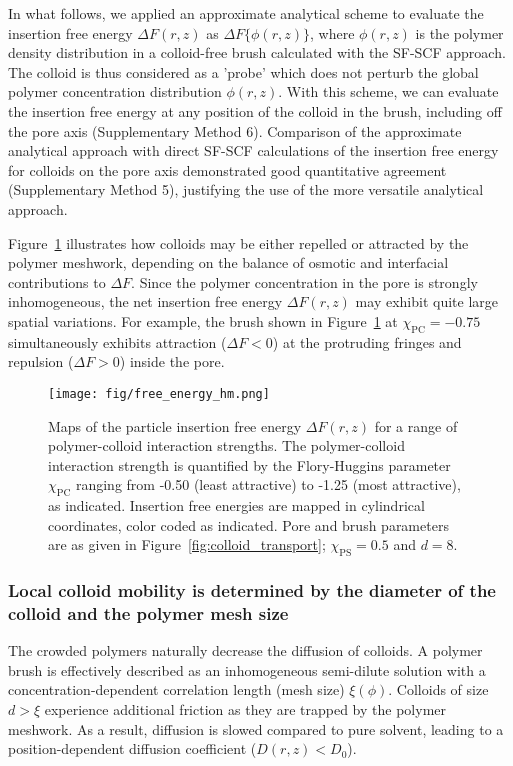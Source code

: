 \documentclass[12pt, a4paper]{article}
\begin{document}
In what follows, we applied an approximate analytical scheme to evaluate the insertion free energy $\Delta F(r,z)$ as $\Delta F\{\phi(r,z)\}$, where $\phi(r,z)$ is the polymer density distribution in a colloid-free brush calculated with the SF-SCF approach.
The colloid is thus considered as a 'probe' which does not perturb the global polymer concentration distribution $\phi(r,z)$.
With this scheme, we can evaluate the insertion free energy at any position of the colloid in the brush, including off the pore axis (Supplementary Method 6).
Comparison of the approximate analytical approach with direct SF-SCF calculations of the insertion free energy for colloids on the pore axis demonstrated good quantitative agreement (Supplementary Method 5), justifying the use of the more versatile analytical approach.

Figure~\ref{fig:DeltaF_map} illustrates how colloids may be either repelled or attracted by the polymer meshwork, depending on the balance of osmotic and interfacial contributions to $\Delta F$.
Since the polymer concentration in the pore is strongly inhomogeneous, the net insertion free energy $\Delta F(r,z)$ may exhibit quite large spatial variations.
For example, the brush shown in Figure~\ref{fig:DeltaF_map} at $\chi_{\text{PC}}=-0.75$ simultaneously exhibits attraction ($\Delta F<0$) at the protruding fringes and repulsion ($\Delta F>0$) inside the pore.

\begin{figure}
    \centering
    \texttt{[image: fig/free\_energy\_hm.png]}
    \caption{
    Maps of the particle insertion free energy $\Delta F(r,z)$ for a range of polymer-colloid interaction strengths.
    The polymer-colloid interaction strength is quantified by the Flory-Huggins parameter $\chi_{\text{PC}}$ ranging from -0.50 (least attractive) to -1.25 (most attractive), as indicated.
    Insertion free energies are mapped in cylindrical coordinates, color coded as indicated.
    Pore and brush parameters are as given in Figure~\ref{fig:colloid_transport}; $\chi_{\text{PS}}=0.5$ and $d=8$.
    }
    \label{fig:DeltaF_map}
\end{figure}


\subsubsection{Local colloid mobility is determined by the diameter of the colloid and the polymer mesh size}

The crowded polymers naturally decrease the diffusion of colloids.
A polymer brush is effectively described as an inhomogeneous semi-dilute solution with a concentration-dependent correlation length (mesh size) $\xi(\phi)$.
Colloids of size $d > \xi$ experience additional friction as they are trapped by the polymer meshwork.
As a result, diffusion is slowed compared to pure solvent, leading to a position-dependent diffusion coefficient ($D(r,z) < D_0$).
\end{document}
